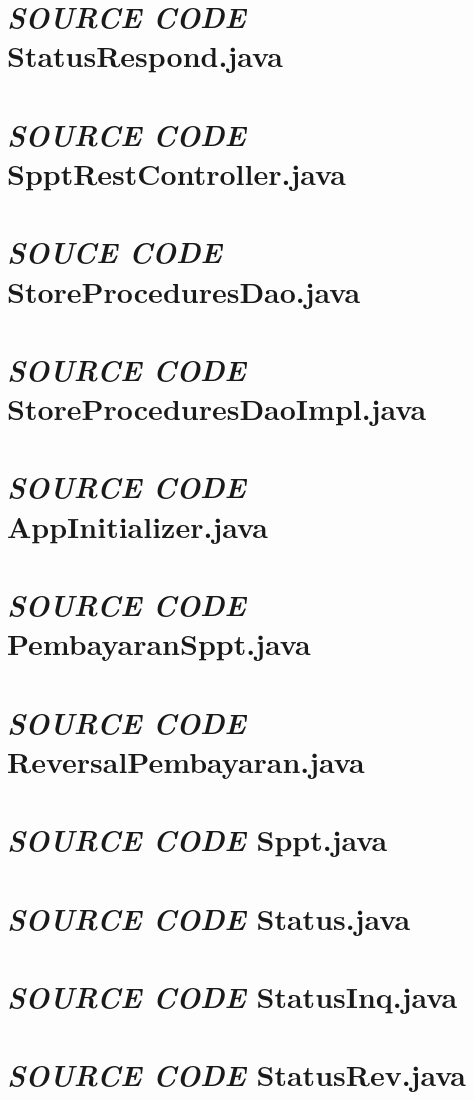 \documentclass[pdftex,12pt, oneside]{article}
\begin{document}
\section{\textit{SOURCE CODE} StatusRespond.java}


\section{\textit{SOURCE CODE} SpptRestController.java}


\section{\textit{SOUCE CODE} StoreProceduresDao.java}


\section{\textit{SOURCE CODE} StoreProceduresDaoImpl.java}


\section{\textit{SOURCE CODE} AppInitializer.java}


\section{\textit{SOURCE CODE} PembayaranSppt.java}


\section{\textit{SOURCE CODE} ReversalPembayaran.java}


\section{\textit{SOURCE CODE} Sppt.java}


\section{\textit{SOURCE CODE} Status.java}


\section{\textit{SOURCE CODE} StatusInq.java}


\section{\textit{SOURCE CODE} StatusRev.java}
\end{document}
